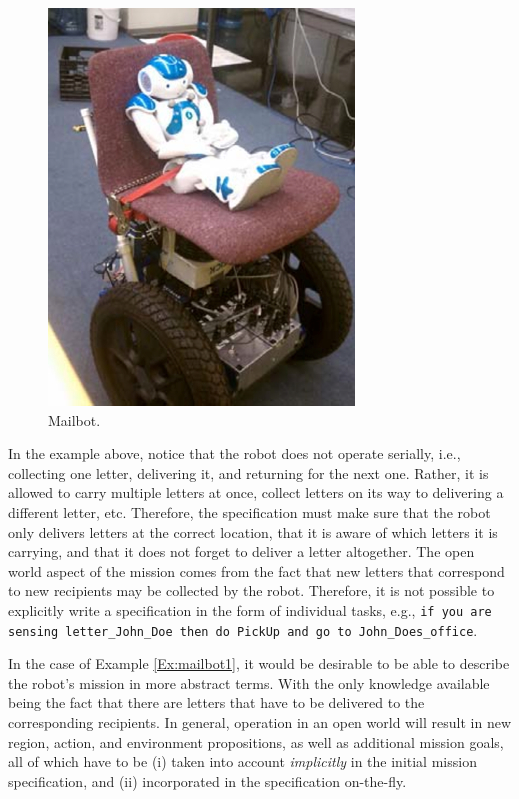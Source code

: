 \begin{figure}[ht]
	\centering
	\includegraphics[width=0.7\columnwidth, clip]{./img/pr3.jpg}
	\caption{Mailbot.}
	\label{Fig:pr3}
\end{figure}

In the example above, notice that the robot does not operate serially, i.e., collecting one letter, delivering it, and returning for the next one. Rather, it is allowed to carry multiple letters at once, collect letters on its way to delivering a different letter, etc. Therefore, the specification must make sure that the robot only delivers letters at the correct location, that it is aware of which letters it is carrying, and that it does not forget to deliver a letter altogether. The open world aspect of the mission comes from the fact that new letters that correspond to new recipients may be collected by the robot. Therefore, it is not possible to explicitly write a specification in the form of individual tasks, e.g., \texttt{if you are sensing letter\_John\_Doe then do PickUp and go to John\_Does\_office}.

In the case of Example \ref{Ex:mailbot1}, it would be desirable to be able to describe the robot's mission in more abstract terms. With the only knowledge available being the fact that there are letters that have to be delivered to the corresponding recipients. In general, operation in an open world will result in new region, action, and environment propositions, as well as additional mission goals, all of which have to be (i) taken into account \emph{implicitly} in the initial mission specification, and (ii) incorporated in the specification on-the-fly.

